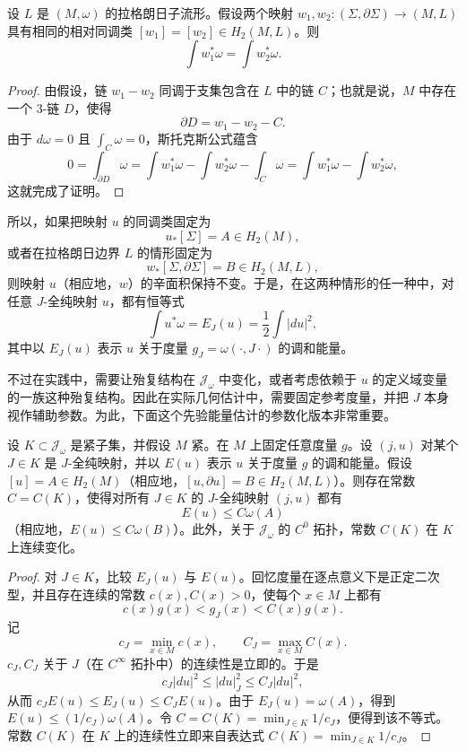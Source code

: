 \begin{lemma}\label{lem:lagrangian-relative-homology-symplectic-area}
设 $L$ 是 $(M,\omega)$ 的拉格朗日子流形。假设两个映射
$w_1,w_2:(\Sigma,\partial\Sigma)\to(M,L)$ 具有相同的相对同调类
$[w_1]=[w_2]\in H_2(M,L)$。则
\[
 \int w_1^*\omega=\int w_2^*\omega.
\]
\end{lemma}

\begin{proof}
由假设，链 $w_1-w_2$ 同调于支集包含在 $L$ 中的链 $C$；也就是说，$M$ 中存在一个 $3$-链 $D$，使得
\[
 \partial D=w_1-w_2-C.
\]
由于 $d\omega=0$ 且 $\int_C\omega=0$，斯托克斯公式蕴含
\[
 0=\int_{\partial D}\omega
 =\int w_1^*\omega-\int w_2^*\omega-\int_C\omega
 =\int w_1^*\omega-\int w_2^*\omega,
\]
这就完成了证明。
\end{proof}

所以，如果把映射 $u$ 的同调类固定为
\[
 u_*[\Sigma]=A\in H_2(M),
\]
或者在拉格朗日边界 $L$ 的情形固定为
\[
 w_*[\Sigma,\partial\Sigma]=B\in H_2(M,L),
\]
则映射 $u$（相应地，$w$）的辛面积保持不变。于是，在这两种情形的任一种中，对任意 $J$-全纯映射 $u$，都有恒等式
\begin{equation}
 \int u^*\omega=E_J(u)=\frac12\int|du|^2,
 \label{eq:j-holomorphic-symplectic-area-energy}
\end{equation}
其中以 $E_J(u)$ 表示 $u$ 关于度量 $g_J=\omega(\cdot,J\cdot)$ 的调和能量。

不过在实践中，需要让殆复结构在 $\mathcal J_\omega$ 中变化，或者考虑依赖于 $u$ 的定义域变量的一族这种殆复结构。因此在实际几何估计中，需要固定参考度量，并把 $J$ 本身视作辅助参数。为此，下面这个先验能量估计的参数化版本非常重要。

\begin{lemma}\label{lem:uniform-energy-varying-j}
设 $K\subset\mathcal J_\omega$ 是紧子集，并假设 $M$ 紧。在 $M$ 上固定任意度量 $g$。设 $(j,u)$ 对某个 $J\in K$ 是 $J$-全纯映射，并以 $E(u)$ 表示 $u$ 关于度量 $g$ 的调和能量。假设 $[u]=A\in H_2(M)$（相应地，$[u,\partial u]=B\in H_2(M,L)$）。则存在常数 $C=C(K)$，使得对所有 $J\in K$ 的 $J$-全纯映射 $(j,u)$ 都有
\[
 E(u)\leq C\omega(A)
\]
（相应地，$E(u)\leq C\omega(B)$）。此外，关于 $\mathcal J_\omega$ 的 $C^0$ 拓扑，常数 $C(K)$ 在 $K$ 上连续变化。
\end{lemma}

\begin{proof}
对 $J\in K$，比较 $E_J(u)$ 与 $E(u)$。回忆度量在逐点意义下是正定二次型，并且存在连续的常数 $c(x),C(x)>0$，使每个 $x\in M$ 上都有
\[
 c(x)g(x)<g_J(x)<C(x)g(x).
\]
记
\[
 c_J=\min_{x\in M}c(x),
 \qquad C_J=\max_{x\in M}C(x).
\]
$c_J,C_J$ 关于 $J$（在 $C^\infty$ 拓扑中）的连续性是立即的。于是
\[
 c_J|du|^2\leq|du|_J^2\leq C_J|du|^2,
\]
从而 $c_JE(u)\leq E_J(u)\leq C_JE(u)$。由于 $E_J(u)=\omega(A)$，得到 $E(u)\leq(1/c_J)\omega(A)$。令
$C=C(K)=\min_{J\in K}1/c_J$，便得到该不等式。常数 $C(K)$ 在 $K$ 上的连续性立即来自表达式
$C(K)=\min_{J\in K}1/c_J$。
\end{proof}


